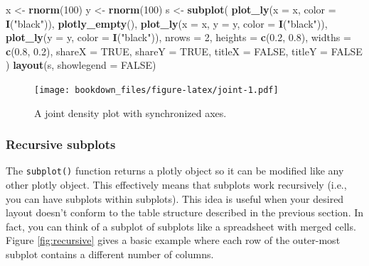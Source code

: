 \documentclass[12pt,]{isuthesis}
\newenvironment{Shaded}{\begin{snugshade}}{\end{snugshade}}
\newcommand{\KeywordTok}[1]{\textcolor[rgb]{0.13,0.29,0.53}{\textbf{{#1}}}}
\newcommand{\DataTypeTok}[1]{\textcolor[rgb]{0.13,0.29,0.53}{{#1}}}
\newcommand{\DecValTok}[1]{\textcolor[rgb]{0.00,0.00,0.81}{{#1}}}
\newcommand{\FloatTok}[1]{\textcolor[rgb]{0.00,0.00,0.81}{{#1}}}
\newcommand{\StringTok}[1]{\textcolor[rgb]{0.31,0.60,0.02}{{#1}}}
\newcommand{\OtherTok}[1]{\textcolor[rgb]{0.56,0.35,0.01}{{#1}}}
\newcommand{\NormalTok}[1]{{#1}}
\begin{document}
\begin{Shaded}
\begin{Highlighting}[]
\NormalTok{x <-}\StringTok{ }\KeywordTok{rnorm}\NormalTok{(}\DecValTok{100}\NormalTok{)}
\NormalTok{y <-}\StringTok{ }\KeywordTok{rnorm}\NormalTok{(}\DecValTok{100}\NormalTok{)}
\NormalTok{s <-}\StringTok{ }\KeywordTok{subplot}\NormalTok{(}
  \KeywordTok{plot_ly}\NormalTok{(}\DataTypeTok{x =} \NormalTok{x, }\DataTypeTok{color =} \KeywordTok{I}\NormalTok{(}\StringTok{"black"}\NormalTok{)), }
  \KeywordTok{plotly_empty}\NormalTok{(), }
  \KeywordTok{plot_ly}\NormalTok{(}\DataTypeTok{x =} \NormalTok{x, }\DataTypeTok{y =} \NormalTok{y, }\DataTypeTok{color =} \KeywordTok{I}\NormalTok{(}\StringTok{"black"}\NormalTok{)), }
  \KeywordTok{plot_ly}\NormalTok{(}\DataTypeTok{y =} \NormalTok{y, }\DataTypeTok{color =} \KeywordTok{I}\NormalTok{(}\StringTok{"black"}\NormalTok{)),}
  \DataTypeTok{nrows =} \DecValTok{2}\NormalTok{, }\DataTypeTok{heights =} \KeywordTok{c}\NormalTok{(}\FloatTok{0.2}\NormalTok{, }\FloatTok{0.8}\NormalTok{), }\DataTypeTok{widths =} \KeywordTok{c}\NormalTok{(}\FloatTok{0.8}\NormalTok{, }\FloatTok{0.2}\NormalTok{), }
  \DataTypeTok{shareX =} \OtherTok{TRUE}\NormalTok{, }\DataTypeTok{shareY =} \OtherTok{TRUE}\NormalTok{, }\DataTypeTok{titleX =} \OtherTok{FALSE}\NormalTok{, }\DataTypeTok{titleY =} \OtherTok{FALSE}
\NormalTok{)}
\KeywordTok{layout}\NormalTok{(s, }\DataTypeTok{showlegend =} \OtherTok{FALSE}\NormalTok{)}
\end{Highlighting}
\end{Shaded}

\begin{figure}
\centering
\texttt{[image: bookdown\_files/figure-latex/joint-1.pdf]}
\caption{\label{fig:joint}A joint density plot with synchronized axes.}
\end{figure}

\subsubsection{Recursive subplots}\label{recursive-subplots}

The \texttt{subplot()} function returns a plotly object so it can be
modified like any other plotly object. This effectively means that
subplots work recursively (i.e., you can have subplots within subplots).
This idea is useful when your desired layout doesn't conform to the
table structure described in the previous section. In fact, you can
think of a subplot of subplots like a spreadsheet with merged cells.
Figure \ref{fig:recursive} gives a basic example where each row of the
outer-most subplot contains a different number of columns.
\end{document}
